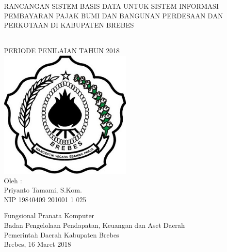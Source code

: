 \begin{titlepage}

\begin{center}
{\large RANCANGAN SISTEM BASIS DATA UNTUK SISTEM INFORMASI PEMBAYARAN PAJAK BUMI DAN BANGUNAN PERDESAAN DAN PERKOTAAN DI KABUPATEN BREBES}

\HRule\\[1cm]

PERIODE PENILAIAN TAHUN 2018\\[1cm]

\includegraphics[width=0.5\textwidth]{./resources/logo}\\[1cm]

Oleh :\\
Priyanto Tamami, S.Kom.\\
NIP 19840409 201001 1 025\\


\vfill


Fungsional Pranata Komputer\\
Badan Pengelolaan Pendapatan, Keuangan dan Aset Daerah\\
Pemerintah Daerah Kabupaten Brebes\\
Brebes, 16 Maret 2018
\end{center}

\end{titlepage}